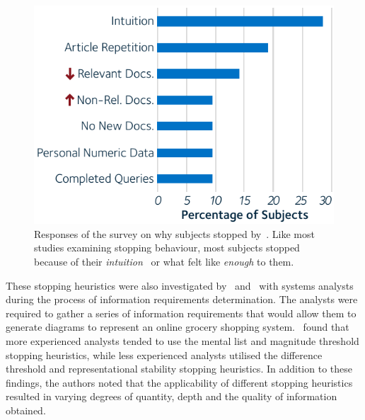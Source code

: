 \begin{figure}
    \begin{center}
    \vspace*{-10mm}
    \includegraphics[width=1\textwidth]{figures/ch3-respondents.pdf}
    \end{center}
    \vspace*{-4mm}
    \caption[Responses of a survey by~\cite{dostert2009satisficing}]{Responses of the survey on why subjects stopped by~\cite{dostert2009satisficing}. Like most studies examining stopping behaviour, most subjects stopped because of their \emph{intuition} \textemdash~or what felt like \emph{enough} to them.}
    \label{fig:stopping_respondents}
\end{figure}

These stopping heuristics were also investigated by~\cite{browne2004stopping_rules} and~\cite{pitts2004stopping_rules} with systems analysts during the process of information requirements determination. The analysts were required to gather a series of information requirements that would allow them to generate diagrams to represent an online grocery shopping system.~\cite{browne2004stopping_rules} found that more experienced analysts tended to use the mental list and magnitude threshold stopping heuristics, while less experienced analysts utilised the difference threshold and representational stability stopping heuristics. In addition to these findings, the authors noted that the applicability of different stopping heuristics resulted in varying degrees of quantity, depth and the quality of information obtained.

